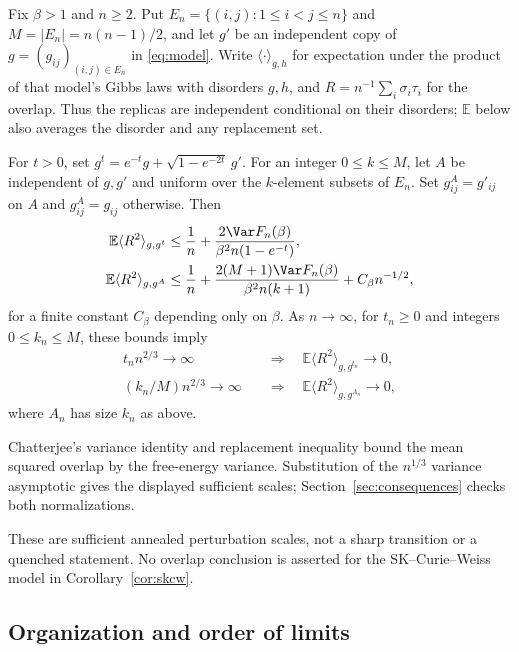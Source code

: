 \begin{corollary}
\label{cor:disorder-chaos}
Fix $\beta>1$ and $n\ge2$. Put $E_n=\{(i,j):1\le i<j\le n\}$ and
$M=|E_n|=n(n-1)/2$, and let $g'$ be an independent copy of
$g=(g_{ij})_{(i,j)\in E_n}$ in \eqref{eq:model}. Write
$\langle\cdot\rangle_{g,h}$ for expectation under the product of that
model's Gibbs laws with disorders $g,h$, and
$R=n^{-1}\sum_i\sigma_i\tau_i$ for the overlap. Thus the replicas are
independent conditional on their disorders; $\mathbb E$ below also
averages the disorder and any replacement set.

For $t>0$, set $g^t=e^{-t}g+\sqrt{1-e^{-2t}}\,g'$. For an integer
$0\le k\le M$, let $A$ be independent of $g,g'$ and uniform over the
$k$-element subsets of $E_n$. Set $g^A_{ij}=g'_{ij}$ on $A$ and
$g^A_{ij}=g_{ij}$ otherwise. Then
\begin{align}
 \mathbb E\langle R^2\rangle_{g,g^t}
 &\le \frac1n+\frac{2\Var F_n(\beta)}
                 {\beta^2n(1-e^{-t})},\label{eq:chaos-ou}\\
 \mathbb E\langle R^2\rangle_{g,g^A}
 &\le \frac1n+\frac{2(M+1)\Var F_n(\beta)}
                 {\beta^2n(k+1)}+C_\beta n^{-1/2},\label{eq:chaos-replacement}
\end{align}
for a finite constant $C_\beta$ depending only on $\beta$. As $n\to\infty$, for
$t_n\ge0$ and integers $0\le k_n\le M$, these bounds imply
\[
 \begin{aligned}
 t_n n^{2/3}\to\infty
 &\quad\Longrightarrow\quad
 \mathbb E\langle R^2\rangle_{g,g^{t_n}}\to0,\\
 (k_n/M)n^{2/3}\to\infty
 &\quad\Longrightarrow\quad
 \mathbb E\langle R^2\rangle_{g,g^{A_n}}\to0,
 \end{aligned}
\]
where $A_n$ has size $k_n$ as above.
\end{corollary}

Chatterjee's variance identity and replacement inequality bound the
mean squared overlap by the free-energy variance. Substitution of the
$n^{1/3}$ variance asymptotic gives the displayed sufficient scales;
Section~\ref{sec:consequences} checks both normalizations.

These are sufficient annealed perturbation scales, not a sharp
transition or a quenched statement. No overlap conclusion is asserted
for the SK--Curie--Weiss model in Corollary~\ref{cor:skcw}.

\subsection{Organization and order of limits}

